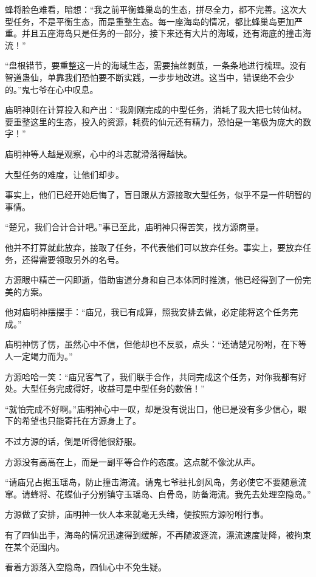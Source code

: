 \begin{this_body}
蜂将脸色难看，暗想：“我之前平衡蜂巢岛的生态，拼尽全力，都不完善。这次大型任务，不是平衡生态，而是重整生态。每一座海岛的情况，都比蜂巢岛更加严重。并且五座海岛只是任务的一部分，接下来还有大片的海域，还有海底的撞击海流！”

“盘根错节，要重整这一片的海域生态，需要抽丝剥茧，一条条地进行梳理。没有智道蛊仙，单靠我们恐怕要不断实践，一步步地改进。这当中，错误绝不会少的。”鬼七爷在心中叹息。

庙明神则在计算投入和产出：“我刚刚完成的中型任务，消耗了我大把七转仙材。要重整这里的生态，投入的资源，耗费的仙元还有精力，恐怕是一笔极为庞大的数字！”

庙明神等人越是观察，心中的斗志就滑落得越快。

大型任务的难度，让他们却步。

事实上，他们已经开始后悔了，盲目跟从方源接取大型任务，似乎不是一件明智的事情。

“楚兄，我们合计合计吧。”事已至此，庙明神只得苦笑，找方源商量。

他并不打算就此放弃，接取了任务，不代表他们可以放弃任务。事实上，要放弃任务，还得需要领取另外的名号。

方源眼中精芒一闪即逝，借助宙道分身和自己本体同时推演，他已经得到了一份完美的方案。

他对庙明神摆摆手：“庙兄，我已有成算，照我安排去做，必定能将这个任务完成。”

庙明神愣了愣，虽然心中不信，但他却也不反驳，点头：“还请楚兄吩咐，在下等人一定竭力而为。”

方源哈哈一笑：“庙兄客气了，我们联手合作，共同完成这个任务，对你我都有好处。大型任务完成得好，收益可是中型任务的数倍！”

“就怕完成不好啊。”庙明神心中一叹，却是没有说出口，他已是没有多少信心，眼下的希望也只能寄托在方源身上了。

不过方源的话，倒是听得他很舒服。

方源没有高高在上，而是一副平等合作的态度。这点就不像沈从声。

“请庙兄占据玉瑶岛，防止撞击海流。请鬼七爷驻扎剑风岛，务必使它不要随意流窜。请蜂将、花蝶仙子分别镇守玉瑶岛、白骨岛，防备海流。我先去处理空隐岛。”

方源做了安排，庙明神一伙人本来就毫无头绪，便按照方源吩咐行事。

有了四仙出手，海岛的情况迅速得到缓解，不再随波逐流，漂流速度陡降，被拘束在某个范围内。

看着方源落入空隐岛，四仙心中不免生疑。


\end{this_body}
